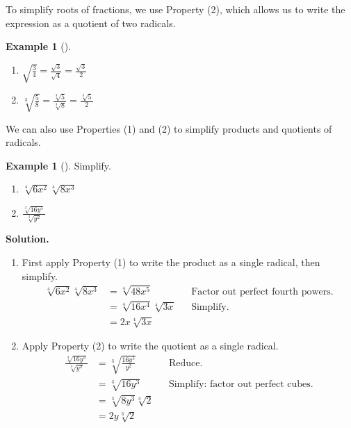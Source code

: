 \documentclass[10pt,]{book}
\theoremstyle{plain}
\theoremstyle{definition}
\theoremstyle{definition}
\newtheorem{example}[theorem]{Example}
\theoremstyle{definition}
\numberwithin{equation}{part}
\newcommand{\amp}{&}
\begin{document}
\par
To simplify roots of fractions, we use Property (2), which allows us to write the expression as a quotient of two radicals.%
\begin{example}[]\label{example-71}
\leavevmode%
\begin{enumerate}[label=*\alph**]
\item\hypertarget{li-340}{}\(\displaystyle{
\sqrt{\frac{3}{4}}=\frac{\sqrt{3}}{\sqrt{4}}=\frac{\sqrt{3}}{2}
}\)%
\item\hypertarget{li-341}{}\(\displaystyle{\sqrt[3]{\frac{5}{8}} =\frac{\sqrt[3]{5}}{\sqrt[3]{8}}=\frac{\sqrt[3]{5}}{2} }\)%
\end{enumerate}
%
\end{example}
\par
We can also use Properties (1) and (2) to simplify products and quotients of radicals.%
\begin{example}[]\label{example-72}
Simplify. \leavevmode%
\begin{enumerate}[label=*\alph**]
\item\hypertarget{li-342}{}\(\sqrt[4]{6x^2} \sqrt[4]{8x^3}\)%
\item\hypertarget{li-343}{}\(\displaystyle{
\frac{\sqrt[3]{16y^5}}{\sqrt[3]{y^2}}
}\)%
\end{enumerate}
%
\par\medskip\noindent%
\textbf{Solution.}\quad \leavevmode%
\begin{enumerate}[label=*\alph**]
\item\hypertarget{li-344}{}First apply Property (1) to write the product as a single radical, then simplify.%
\begin{align*}
\sqrt[4]{6x^2} \sqrt[4]{8x^3}\amp =\sqrt[4]{48x^5}\amp\amp\text{Factor out perfect fourth powers.} 
\\
\amp = \sqrt[4]{16x^4}\sqrt[4]{3x}\amp\amp\text{Simplify.}
\\
\amp = 2x \sqrt[4]{3x}
\end{align*}
%
\item\hypertarget{li-345}{}Apply Property (2) to write the quotient as a single radical.%
\begin{align*}
\frac{\sqrt[3]{16y^5}}{\sqrt[3]{y^2}}\amp =\sqrt[3]{\frac{16y^5}{y^2}}\amp\amp\text{Reduce.} 
\\
\amp = \sqrt[3]{16y^3}\amp\amp\text{Simplify: factor out perfect cubes.}
\\
\amp = \sqrt[3]{8y^3}\sqrt[3]{2}
\\
\amp = 2y \sqrt[3]{2}
\end{align*}
%
\end{enumerate}
%
\end{example}
\typeout{************************************************}
\typeout{************************************************}
\end{document}
